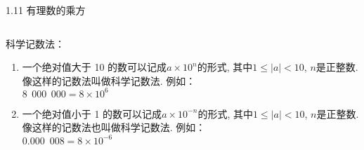 \documentclass[aspectratio=169]{ctexbeamer} %
\begin{document}
\begin{frame}[t]{1.11 有理数的乘方}
\begin{columns}
\begin{spacing}{1.2}
\normalsize
科学记数法：
\begin{enumerate}[label={\arabic*.}]
\item 一个绝对值大于 10 的数可以记成$a×10^n$的形式, 其中$1 ≤| a | < 10$, $n$是正整数. 像这样的记数法叫做科学记数法. 例如：\\
$8 \phantom{e} 000 \phantom{e} 000 = 8×10 ^6$
\item 一个绝对值小于 1 的数可以记成$a×10^{-n}$的形式, 其中$1≤|a| < 10$, $n$是正整数. 像这样的记数法也叫做科学记数法. 例如：\\
$0.000  \phantom{0} 008 = 8×10 ^{-6}$

\end{enumerate}
\end{spacing}
\end{columns}
\end{frame}
\end{document}
